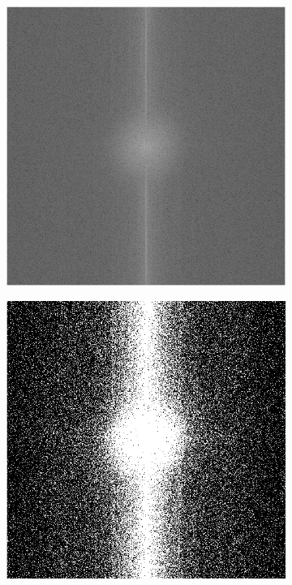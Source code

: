 \documentclass{article}
\begin{document}
\begin{figure}[H]
	\begin{subfigure}[b]{0.32\textwidth}
		\includegraphics[width=\linewidth]{step1_dp}
		\caption{}
		\label{fig:step1lpf }
	\end{subfigure}%
	\hspace{\fill}
	\begin{subfigure}[b]{0.32\textwidth}
		\includegraphics[width=\linewidth]{step2}

\end{subfigure}
\end{figure}
\end{document}
